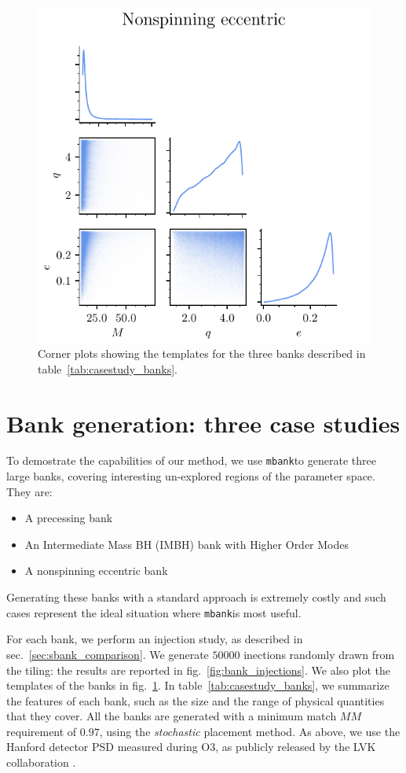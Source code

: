 \documentclass[twocolumn,showpacs,preprintnumbers,nofootinbib,prd,
superscriptaddress,10pt]{revtex4-2}
\newcommand{\mbank}{\texttt{mbank}}
\begin{document}
\begin{figure}[t]
	\includegraphics{bank_scatter_Nonspinning_eccentric}
	\caption{Corner plots showing the templates for the three banks described in table~\ref{tab:casestudy_banks}. }
	\label{fig:bank_scatter}
\end{figure}

\section{Bank generation: three case studies} \label{sec:bank_generation}

To demostrate the capabilities of our method, we use \mbank to generate three large banks, covering interesting un-explored regions of the parameter space.
They are:
	\begin{itemize}
		\item A precessing bank
		\item An Intermediate Mass BH (IMBH) bank with Higher Order Modes
		\item A nonspinning eccentric bank
	\end{itemize}
Generating these banks with a standard approach is extremely costly and such cases represent the ideal situation where \mbank is most useful.

For each bank, we perform an injection study, as described in sec.~\ref{sec:sbank_comparison}. We generate $50000$ inections randomly drawn from the tiling: the results are reported in fig.~\ref{fig:bank_injections}. We also plot the templates of the banks in fig.~\ref{fig:bank_scatter}.
In table~\ref{tab:casestudy_banks}, we summarize the features of each bank, such as the size and the range of physical quantities that they cover.
All the banks are generated with a minimum match $MM$ requirement of $0.97$, using the {\it stochastic} placement method.
As above, we use the Hanford detector PSD measured during O3, as publicly released by the LVK collaboration \cite{https://dcc.ligo.org/LIGO-T2000012/public}.
\end{document}
